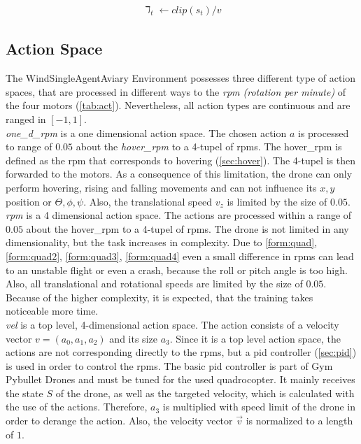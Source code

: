 \newline
\begin{align}
	\daleth_t \leftarrow clip(s_t) / v \label{eq:clipnorm}
\end{align}
\newline

\newpage

\subsection{Action Space}
The WindSingleAgentAviary Environment possesses three different type of action spaces, that are processed in different ways to the \emph{rpm (rotation per minute)} of the four motors (\cref{tab:act}). Nevertheless, all action types are continuous and are ranged in $[-1, 1]$.\\
\newline
\emph{one\_d\_rpm} is a one dimensional action space. The chosen action $a$ is processed to range of $0.05$ about the \emph{hover\_rpm} to a 4-tupel of rpms. The hover\_rpm is defined as the rpm that corresponds to hovering (\cref{sec:hover}). The 4-tupel is then forwarded to the motors. As a consequence of this limitation, the drone can only perform hovering, rising and falling movements and can not influence its $x,y$ position or $\Theta, \phi, \psi$. Also, the translational speed $v_z$ is limited by the size of $0.05$.\\
\newline
\emph{rpm} is a 4 dimensional action space. The actions are processed within a range of $0.05$ about the hover\_rpm to a 4-tupel of rpms. The drone is not limited in any dimensionality, but the task increases in complexity. Due to \cref{form:quad}, \cref{form:quad2}, \cref{form:quad3}, \cref{form:quad4} even a small difference in rpms can lead to an unstable flight or even a crash, because the roll or pitch angle is too high. Also, all translational and rotational speeds are limited by the size of $0.05$. Because of the higher complexity, it is expected, that the training takes noticeable more time.\\
\newline
\emph{vel} is a top level, 4-dimensional action space. The action consists of a velocity vector $v = (a_0, a_1, a_2)$ and its size $a_3$.  Since it is a top level action space, the actions are not corresponding directly to the rpms, but a pid controller (\cref{sec:pid}) is used in order to control the rpms. The basic pid controller is part of Gym Pybullet Drones \cite{panerati2021learning} and must be tuned for the used quadrocopter. It mainly receives the state $S$ of the drone, as well as the targeted velocity, which is calculated with the use of the actions. Therefore, $a_3$ is multiplied with speed limit of the drone in order to derange the action. Also, the velocity vector $\overrightarrow{v}$ is normalized to a length of $1$.\\

